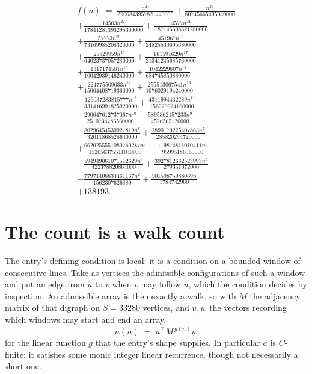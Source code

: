 \documentclass[11pt,a4paper]{article}
\theoremstyle{plain}
\theoremstyle{definition}
\begin{document}
\begin{multline*}
f(n)\;=\;\frac{n^{24}}{2906843957821440000} + \frac{n^{23}}{80745665495040000} \\
+ \frac{14503 n^{22}}{17841281393295360000} + \frac{4577 n^{21}}{187146308321280000} \\
+ \frac{57773 n^{20}}{73169985208320000} + \frac{451967 n^{19}}{24825530695680000} \\
+ \frac{25829959 n^{18}}{64023737057280000} + \frac{161591629 n^{17}}{21341245685760000} \\
+ \frac{1317174581 n^{16}}{10042939146240000} + \frac{1042229807 n^{15}}{684745850880000} \\
+ \frac{224775509633 n^{14}}{15064408719360000} + \frac{255513067541 n^{13}}{1076029194240000} \\
- \frac{126037283815777 n^{12}}{331416991825920000} + \frac{4311994432289 n^{11}}{156920924160000} \\
- \frac{290647612737067 n^{10}}{2510734786560000} + \frac{5895362157233 n^{9}}{4526565120000} \\
- \frac{80296454539927819 n^{8}}{32011868528640000} + \frac{2890170225407863 n^{7}}{285820254720000} \\
+ \frac{6620255551080740287 n^{6}}{152056375511040000} - \frac{119874811010411 n^{5}}{95995186560000} \\
- \frac{594949061071512629 n^{4}}{422378820864000} + \frac{3927812632523993 n^{3}}{279351072000} \\
- \frac{77971408834461167 n^{2}}{1562307626880} + \frac{50159875988069 n}{1784742960} \\
+ 138193.
\end{multline*}

\section{The count is a walk count}

The entry's defining condition is local: it is a condition on a bounded window of consecutive lines. Take as vertices the
admissible configurations of such a window and put an edge from $u$ to $v$ when $v$ may
follow $u$, which the condition decides by inspection. An admissible array is then exactly a
walk, so with $M$ the adjacency matrix of that digraph on $S=33280$ vertices, and $u,w$ the
vectors recording which windows may start and end an array,
\[
a(n)\;=\;u^{\!\top}M^{\,g(n)}w
\]
for the linear function $g$ that the entry's shape supplies. In particular $a$ is
$C$-finite: it satisfies some monic integer linear recurrence, though not necessarily a short
one.
\end{document}
